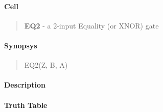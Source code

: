 \label{EQ2}
\paragraph{Cell}
\begin{quote}
    \textbf{EQ2} - a 2-input Equality (or XNOR) gate
\end{quote}

\paragraph{Synopsys}
\begin{quote}
    EQ2(Z, B, A)
\end{quote}

\paragraph{Description}

%

\paragraph{Truth Table}


